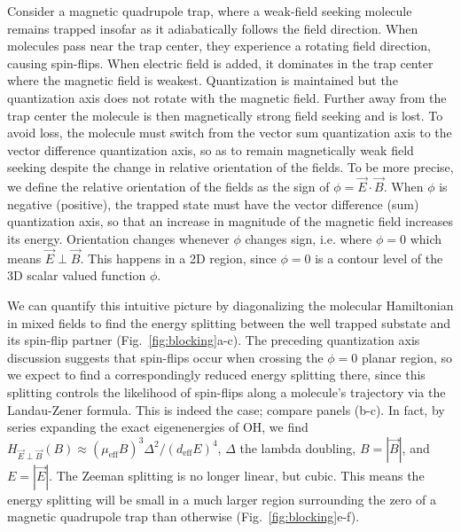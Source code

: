 \documentclass[%
 reprint,
 amsmath,amssymb,
 aps,
prl,
]{revtex4-1}
\newcommand{\epb}{{$\vec{E}\!\perp\!\vec{B}$}}
\newcommand{\epbm}{{\vec{E}\!\perp\!\vec{B}}}
\begin{document}
Consider a magnetic quadrupole trap, where a weak-field seeking molecule remains trapped insofar as it adiabatically follows the field direction. 
When molecules pass near the trap center, they experience a rotating field direction, causing spin-flips. 
When electric field is added, it dominates in the trap center where the magnetic field is weakest. 
Quantization is maintained but the quantization axis does not rotate with the magnetic field. 
Further away from the trap center the molecule is then magnetically strong field seeking and is lost. 
To avoid loss, the molecule must switch from the vector sum quantization axis to the vector difference quantization axis, so as to remain magnetically weak field seeking despite the change in relative orientation of the fields. 
To be more precise, we define the relative orientation of the fields as the sign of $\phi=\vec{E}\cdot\vec{B}$. 
When $\phi$ is negative (positive), the trapped state must have the vector difference (sum) quantization axis, so that an increase in magnitude of the magnetic field increases its energy. 
Orientation changes whenever $\phi$ changes sign, i.e. where $\phi=0$ which means \epb. 
This happens in a 2D region, since $\phi=0$ is a contour level of the 3D scalar valued function $\phi$. 

We can quantify this intuitive picture by diagonalizing the molecular Hamiltonian in mixed fields to find the energy splitting between the well trapped substate and its spin-flip partner (Fig.~\ref{fig:blocking}a-c). 
The preceding quantization axis discussion suggests that spin-flips occur when crossing the $\phi=0$ planar region, so we expect to find a correspondingly reduced energy splitting there, since this splitting controls the likelihood of spin-flips along a molecule's trajectory via the Landau-Zener formula. 
This is indeed the case; compare panels (b-c). In fact, by series expanding the exact eigenenergies of OH, we find $H_\epbm(B)\approx (\mu_\text{eff}B)^3\Delta^2/(d_\text{eff}E)^4$, $\Delta$ the lambda doubling, $B=|\vec{B}|$, and $E=|\vec{E}|$. 
The Zeeman splitting is no longer linear, but cubic. 
This means the energy splitting will be small in a much larger region surrounding the zero of a magnetic quadrupole trap than otherwise (Fig.~\ref{fig:blocking}e-f).
\end{document}
